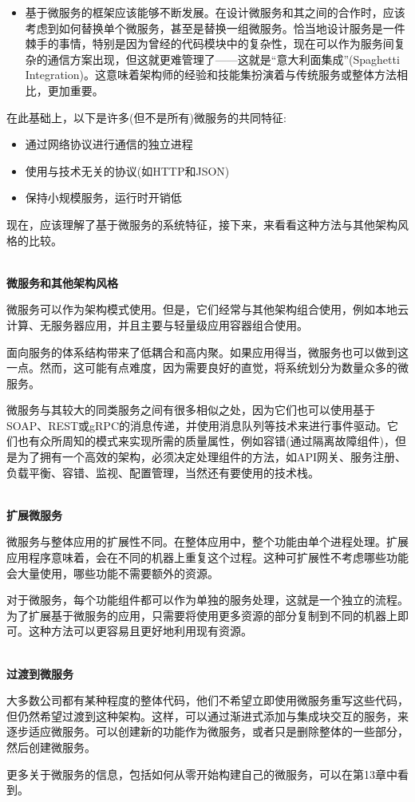 \begin{itemize}
\item
基于微服务的框架应该能够不断发展。在设计微服务和其之间的合作时，应该考虑到如何替换单个微服务，甚至是替换一组微服务。恰当地设计服务是一件棘手的事情，特别是因为曾经的代码模块中的复杂性，现在可以作为服务间复杂的通信方案出现，但这就更难管理了——这就是“意大利面集成”(Spaghetti Integration)。这意味着架构师的经验和技能集扮演着与传统服务或整体方法相比，更加重要。

\end{itemize}

在此基础上，以下是许多(但不是所有)微服务的共同特征:

\begin{itemize}
\item	
通过网络协议进行通信的独立进程
	
\item
使用与技术无关的协议(如HTTP和JSON)

\item
保持小规模服务，运行时开销低
\end{itemize}

现在，应该理解了基于微服务的系统特征，接下来，来看看这种方法与其他架构风格的比较。

\hspace*{\fill} \\ %
\noindent
\textbf{微服务和其他架构风格}

微服务可以作为架构模式使用。但是，它们经常与其他架构组合使用，例如本地云计算、无服务器应用，并且主要与轻量级应用容器组合使用。

面向服务的体系结构带来了低耦合和高内聚。如果应用得当，微服务也可以做到这一点。然而，这可能有点难度，因为需要良好的直觉，将系统划分为数量众多的微服务。

微服务与其较大的同类服务之间有很多相似之处，因为它们也可以使用基于SOAP、REST或gRPC的消息传递，并使用消息队列等技术来进行事件驱动。它们也有众所周知的模式来实现所需的质量属性，例如容错(通过隔离故障组件)，但是为了拥有一个高效的架构，必须决定处理组件的方法，如API网关、服务注册、负载平衡、容错、监视、配置管理，当然还有要使用的技术栈。

\hspace*{\fill} \\ %
\noindent
\textbf{扩展微服务}

微服务与整体应用的扩展性不同。在整体应用中，整个功能由单个进程处理。扩展应用程序意味着，会在不同的机器上重复这个过程。这种可扩展性不考虑哪些功能会大量使用，哪些功能不需要额外的资源。

对于微服务，每个功能组件都可以作为单独的服务处理，这就是一个独立的流程。为了扩展基于微服务的应用，只需要将使用更多资源的部分复制到不同的机器上即可。这种方法可以更容易且更好地利用现有资源。

\hspace*{\fill} \\ %
\noindent
\textbf{过渡到微服务}

大多数公司都有某种程度的整体代码，他们不希望立即使用微服务重写这些代码，但仍然希望过渡到这种架构。这样，可以通过渐进式添加与集成块交互的服务，来逐步适应微服务。可以创建新的功能作为微服务，或者只是删除整体的一些部分，然后创建微服务。 

更多关于微服务的信息，包括如何从零开始构建自己的微服务，可以在第13章中看到。













